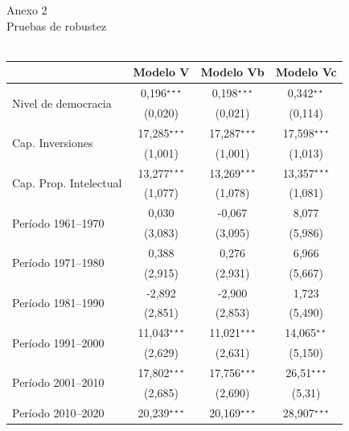 \documentclass[a4paper]{tufte-handout}
\begin{document}
\begin{table}[h!]
  \centering
  \selectfont
   \smallskip\noindent\small Anexo 2 \\ Pruebas de robustez \\~\\
  \begin{tabular}{l c c c}
    \toprule
     & Modelo V & Modelo Vb & Modelo Vc \\ \midrule
    \multirow{2}{*}{Nivel de democracia} & 0,196$^{\star\star\star}$ & 0,198$^{\star\star\star}$ & 0,342$^{\star\star}$ \\
    & {\scriptsize (0,020)} & {\scriptsize (0,021)} & {\scriptsize (0,114)} \\ 
    \multirow{2}{*}{Cap. Inversiones} & 17,285$^{\star\star\star}$ & 17,287$^{\star\star\star}$ & 17,598$^{\star\star\star}$ \\
    & {\scriptsize (1,001)} & {\scriptsize (1,001)} & {\scriptsize (1,013)} \\
    \multirow{2}{*}{Cap. Prop. Intelectual} & 13,277$^{\star\star\star}$ & 13,269$^{\star\star\star}$ & 13,357$^{\star\star\star}$ \\
    & {\scriptsize (1,077)} & {\scriptsize (1,078)} & {\scriptsize (1,081)}\\
    \multirow{2}{*}{Período 1961--1970} & 0,030 & -0,067 & 8,077 \\
    & {\scriptsize (3,083)} & {\scriptsize (3,095)} & {\scriptsize (5,986)} \\
    \multirow{2}{*}{Período 1971--1980} & 0,388 & 0,276 & 6,966 \\
    & {\scriptsize (2,915)} & {\scriptsize (2,931)} & {\scriptsize (5,667)} \\
    \multirow{2}{*}{Período  1981--1990} & -2,892 & -2,900 & 1,723 \\
    & {\scriptsize (2,851)} & {\scriptsize (2,853)} & {\scriptsize (5,490)} \\
    \multirow{2}{*}{Período 1991--2000} & 11,043$^{\star\star\star}$ & 11,021$^{\star\star\star}$  & 14,065$^{\star\star}$ \\
    & {\scriptsize (2,629)} & {\scriptsize (2,631)} & {\scriptsize (5,150)} \\ 
    \multirow{2}{*}{Período  2001--2010} & 17,802$^{\star\star\star}$ & 17,756$^{\star\star\star}$ & 26,51$^{\star\star\star}$ \\
    & {\scriptsize (2,685)} & {\scriptsize (2,690)} & {\scriptsize (5,31)} \\ 
    \multirow{2}{*}{Período 2010--2020} & 20,239$^{\star\star\star}$ & 20,169$^{\star\star\star}$ & 28,907$^{\star\star\star}$ \\

\end{tabular}
\end{table}
\end{document}
